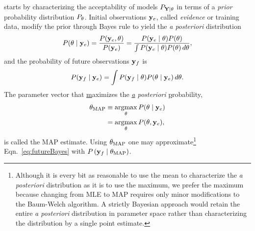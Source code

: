  starts by characterizing the
acceptability of models $P_{{\bf Y}\mid \theta}$ in terms of a
\emph{prior} probability distribution $P_{\theta}$.  Initial
observations $\mathbf{y}_e$, called \emph{evidence} or training data, modify
the prior through Bayes rule to yield the \emph{a posteriori}
distribution
\begin{equation}
  \label{eq:posteriori}
  P(\theta\mid \mathbf{y}_e) = \frac{P(\mathbf{y}_e,\theta)}{P(\mathbf{y}_e)} =
  \frac{P(\mathbf{y}_e\mid \theta)P(\theta)}{\int P(\mathbf{y}_e\mid \theta)P(\theta)\,
  d\theta},
\end{equation}
and the probability of future observations $\mathbf{y}_f$ is
\begin{equation}
  \label{eq:futureBayes}
  P(\mathbf{y}_f\mid \mathbf{y}_e) = \int  P(\mathbf{y}_f\mid \theta) P(\theta\mid \mathbf{y}_e)\, d\theta.
\end{equation}
The parameter vector that \underline{m}aximizes the \emph{\underline{a}
  posteriori} \underline{p}robability, 
\begin{subequations}
  \begin{align}
    \label{eq:MAPdefa}
    \theta_{\text{MAP}} &\equiv \operatorname*{argmax}_\theta P(\theta\mid \mathbf{y}_e) \\
    \label{eq:MAPdefb}
    &= \operatorname*{argmax}_\theta P(\theta,\mathbf{y}_e),
  \end{align}
\end{subequations}
is called the MAP estimate.   Using $\theta_{\text{MAP}}$ one may
approximate\footnote{Although it is every bit as reasonable to use the
  mean to characterize the \emph{a posteriori} distribution as it is to
  use the maximum, we prefer the maximum because changing from MLE to
  MAP requires only minor modifications to the Baum-Welch algorithm.
  A strictly Bayesian approach would retain the entire \emph{a
    posteriori} distribution in parameter space rather than
  characterizing the distribution by a single point estimate.}
Eqn.~\eqref{eq:futureBayes} with $P\left( \mathbf{y}_f\mid \theta_{
    \text{MAP} } \right)$.

